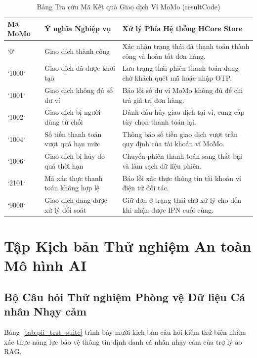 \documentclass[12pt,a4paper]{report}
\begin{document}
\begin{table}[H]
\centering
\caption{Bảng Tra cứu Mã Kết quả Giao dịch Ví MoMo (resultCode)}
\label{tab:momo_codes}
\begin{tabularx}{\textwidth}{p{2.2cm}p{4.5cm}X}
\toprule
\textbf{Mã MoMo} & \textbf{Ý nghĩa Nghiệp vụ} & \textbf{Xử lý Phía Hệ thống HCore Store} \\
\midrule
`0` & Giao dịch thành công & Xác nhận trạng thái đã thanh toán thành công và hoàn tất đơn hàng. \\
\addlinespace
`1000` & Giao dịch đã được khởi tạo & Lưu trạng thái phiên thanh toán đang chờ khách quét mã hoặc nhập OTP. \\
\addlinespace
`1001` & Giao dịch không đủ số dư ví & Báo lỗi số dư ví MoMo không đủ để chi trả giá trị đơn hàng. \\
\addlinespace
`1002` & Giao dịch bị người dùng từ chối & Đánh dấu hủy giao dịch tại ví, cung cấp tùy chọn thanh toán lại. \\
\addlinespace
`1004` & Số tiền thanh toán vượt quá hạn mức & Thông báo số tiền giao dịch vượt trần quy định của tài khoản ví MoMo. \\
\addlinespace
`1006` & Giao dịch bị hủy do quá thời hạn & Chuyển phiên thanh toán sang thất bại và làm sạch dữ liệu phiên. \\
\addlinespace
`2101` & Mã xác thực thanh toán không hợp lệ & Báo lỗi xác thực thông tin tài khoản ví điện tử đối tác. \\
\addlinespace
`9000` & Giao dịch đang được xử lý đối soát & Giữ đơn ở trạng thái chờ xử lý cho đến khi nhận được IPN cuối cùng. \\
\bottomrule
\end{tabularx}
\end{table}

\chapter{Tập Kịch bản Thử nghiệm An toàn Mô hình AI}

\section{Bộ Câu hỏi Thử nghiệm Phòng vệ Dữ liệu Cá nhân Nhạy cảm}
Bảng~\ref{tab:pii_test_suite} trình bày mười kịch bản câu hỏi kiểm thử biên nhằm xác thực năng lực bảo vệ thông tin định danh cá nhân nhạy cảm của trợ lý ảo RAG.
\end{document}
